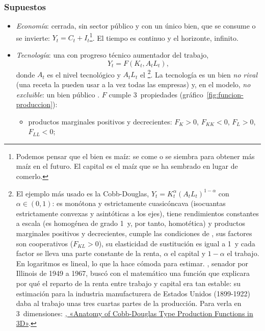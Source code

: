 \documentclass[11pt]{article}
\begin{document}
\subsubsection{Supuestos}

\begin{itemize}
\item \emph{Economía}: cerrada, sin sector público y con un único bien, que se consume o se invierte: $Y_t=C_t+I_t$\footnote{Podemos pensar que el bien es maíz: se come o se siembra para obtener más maíz en el futuro. El capital es el maíz que se ha sembrado en lugar de comerlo.}. El tiempo es continuo y el horizonte, infinito.
\item \emph{Tecnología}: una  con progreso técnico aumentador del trabajo,
  \begin{equation}
  Y_t=F(K_t,A_tL_t),\label{eq:produccion}
  \end{equation}
  donde $A_t$ es el nivel tecnológico y $A_tL_t$ el \footnote{El ejemplo más usado es la Cobb-Douglas, $Y_t=K_t^{\alpha}(A_tL_t)^{1-\alpha}$ con $\alpha\in(0,1)$: es monótona y estrictamente cuasicóncava (isocuantas estrictamente convexas y asintóticas a los ejes), tiene rendimientos constantes a escala (es homogénea de grado 1~y, por tanto, homotética) y productos marginales positivos y decrecientes, cumple las condiciones de , sus factores son cooperativos ($F_{KL}>0$), su elasticidad de sustitución es igual a 1~y cada factor se lleva una parte constante de la renta, $\alpha$ el capital y $1-\alpha$ el trabajo. En logaritmos es lineal, lo que la hace cómoda para estimar. , senador por Illinois de 1949 a 1967, buscó con el matemático  una función que explicara por qué el reparto de la renta entre trabajo y capital era tan estable: su estimación para la industria manufacturera de Estados Unidos (1899-1922) daba al trabajo unas tres cuartas partes de la producción\nocite{CobbDouglas1928,Douglas1976}. Para verla en 3~dimensiones: \href{https://web.archive.org/web/20260106065001/http://www2.hawaii.edu/~fuleky/anatomy/anatomy.html}{, «Anatomy of Cobb-Douglas Type Production Functions in 3D»}.}. La tecnología es un bien \emph{no rival} (una receta la pueden usar a la vez todas las empresas) y, en el modelo, \emph{no excluible}: un bien público . $F$ cumple 3~propiedades (gráfico~\ref{fig:funcion-produccion}):
  \begin{itemize}
  \item productos marginales positivos y decrecientes: $F_K>0$, $F_{KK}<0$, $F_L>0$, $F_{LL}<0$;

\end{itemize}
\end{itemize}
\end{document}
